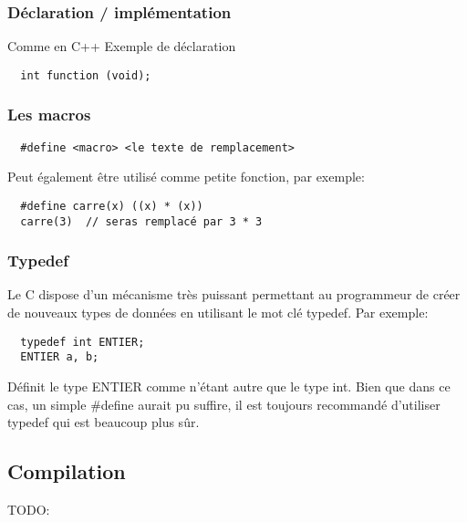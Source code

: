 \documentclass[a4paper]{article}
\begin{document}
\subsubsection{Déclaration / implémentation}
Comme en C++\newline
Exemple de déclaration
\begin{lstlisting}
  int function (void);
\end{lstlisting}
\subsubsection{Les macros}
\begin{lstlisting}
  #define <macro> <le texte de remplacement>
\end{lstlisting}
Peut également être utilisé comme petite fonction, par exemple:
\begin{lstlisting}
  #define carre(x) ((x) * (x))
  carre(3)  // seras remplacé par 3 * 3
\end{lstlisting}
\subsubsection{Typedef}
Le C dispose d'un mécanisme très puissant permettant au programmeur de créer de nouveaux types de données en utilisant le mot clé typedef. Par exemple:
\begin{lstlisting}
  typedef int ENTIER;
  ENTIER a, b;
\end{lstlisting}
Définit le type ENTIER comme n'étant autre que le type int. Bien que dans ce cas, un simple \#define aurait pu suffire, il est toujours recommandé d'utiliser typedef qui est beaucoup plus sûr.

\subsection{Compilation}
TODO:
\end{document}

